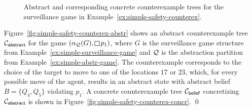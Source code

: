 \begin{figure}
\hfill
{}
\caption{Abstract and corresponding concrete counterexample trees for the surveillance game in Example~\ref{ex:simple-safety-counterex}.}
\label{fig:simple-safety-counterex}

\end{figure}

\begin{example}\label{ex:simple-safety-counterex}
Figure~\ref{fig:simple-safety-counterex-abstr} shows an abstract counterexample tree $\mathcal{C}_{\mathsf{abstract}}$ for the game $(\alpha_\part(G),\LTLglobally p_1)$, where $G$ is the surveillance game structure from Example~\ref{ex:simple-surveillance-game} and $\mathcal{Q}$ is the abstraction partition from Example~\ref{ex:simple-abstr-game}. The counterexample corresponds to the choice of the target to move to one of the locations $17$ or $23$, which, for every possible move of the agent, results in an abstract state with abstract belief $B = \{Q_4,Q_5\}$ violating $p_1$.
A concrete counterexample tree $\mathcal{C}_{\mathsf{belief}}$ concretizing $\mathcal{C}_{\mathsf{abstract}}$ is shown in Figure~\ref{fig:simple-safety-counterex-concr}.
\qed
\end{example}
